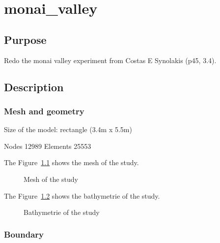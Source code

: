 \chapter{monai\_valley}

\section{Purpose}

Redo the monai valley experiment from Costas E Synolakis (p45, 3.4)\cite{Costas2007}.

\section{Description}

\subsection{Mesh and geometry}

Size of the model: rectangle (3.4m x 5.5m)

Nodes   12989
Elements  25553

The Figure~\ref{fig:monai:mesh} shows the mesh of the study.
\begin{figure}
\centering
{}
\caption{Mesh of the study}\label{fig:monai:mesh}
\end{figure}

The Figure~\ref{fig:monai:bathy} shows the bathymetrie of the study.
\begin{figure}
\centering
{}
\caption{Bathymetrie of the study}\label{fig:monai:bathy}
\end{figure}

\subsection{Boundary}

